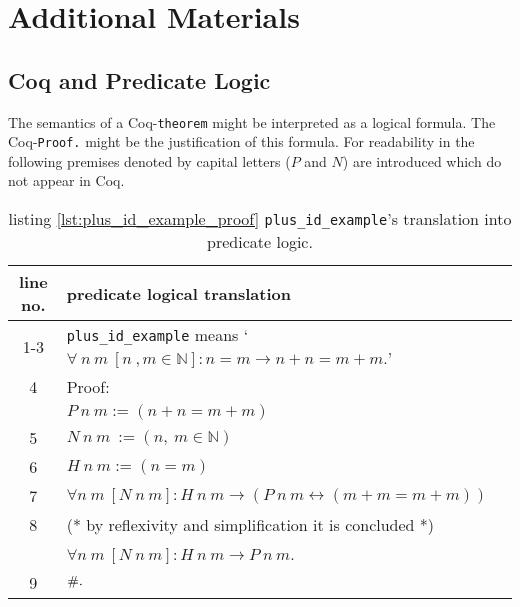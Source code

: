 \section{Additional Materials}
\label{app:AdditionalMaterials}

\subsection{Coq and Predicate Logic} 
\label{subsec:CoqAndPredicateLogic}

	The semantics of a Coq-\lstinline!theorem! might be interpreted as a logical formula.
	The Coq-\lstinline!Proof.! might be the justification of this formula. 
	For readability in the following premises denoted by capital letters ($P$ and $N$) are introduced which do not appear in Coq.
	
	\begin{table}[h]
		\begin{center}
			\begin{tabular}{|c|l|}
			    \hline
	 			line no.  &  predicate logical translation \\  \hline
		     	  1-3    %
		                  & \lstinline!plus_id_example! means `$ \forall\ n\ m\ [n\ , m \in \mathbb{N}]: n = m \rightarrow n+n = m+m.$'\\ \hline        
		     	  4       & Proof: \\     	     	      	                      
		                  &   $ P\ n\ m:= (n+n = m+m)$    \\ \hline
		          5       &   $N \ n \ m \ := ( n,\ m \in \mathbb{N})$       \\ \hline       
		          6       &   $ H\ n\ m :=( n= m)$ \\        
		    	      7       &   $ \forall n \ m\ [N \ n\ m]: H\ n\ m \rightarrow (P\ n\ m \leftrightarrow( m+m = m+m))$\\   \hline 
		          8       &   (* by reflexivity and simplification it is concluded *) \\
		                  & $\forall n\ m\ [ N\ n\ m]: H\ n\ m  \rightarrow P\ n\ m$.  \\  \hline
		          9       & $\qed.$\\ \hline        	          
	        		\end{tabular}
		\end{center}
		\label{tab:CoqAndPreciateLogic}
		\caption{listing \ref{lst:plus_id_example_proof} \lstinline!plus_id_example!'s translation into predicate logic.} 
	\end{table}

